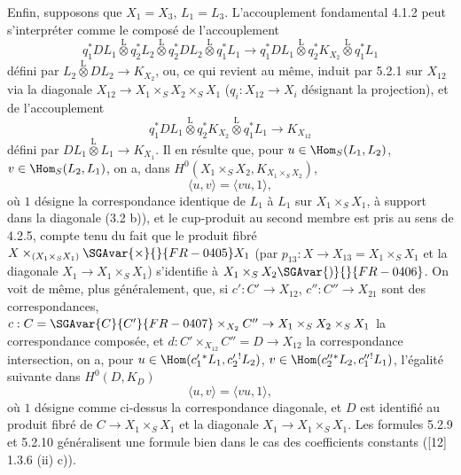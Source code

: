Enfin, supposons que $X_1=X_3$, $L_1=L_3$. L'accouplement fondamental 4.1.2 peut s'interpréter comme le composé de l'accouplement
\begin{equation}
\tag{5.2.7}
q_1^*DL_1\overset{\mathrm{L}}{\otimes}q_2^*L_2\overset{\mathrm{L}}{\otimes}q_2^*DL_2\overset{\mathrm{L}}{\otimes}q_1^*L_1
\longrightarrow
q_1^*DL_1\overset{\mathrm{L}}{\otimes}q_2^*K_{X_2}\overset{\mathrm{L}}{\otimes}q_1^*L_1
\end{equation}
défini par $L_2\overset{\mathrm{L}}{\otimes}DL_2\to K_{X_2}$, ou, ce qui revient au même, induit par 5.2.1 sur $X_{12}$ via la diagonale $X_{12}\to X_1\times_SX_2\times_SX_1$ ($q_i:X_{12}\to X_i$ désignant la projection), et de l'accouplement
\begin{equation}
\tag{5.2.8}
q_1^*DL_1\overset{\mathrm{L}}{\otimes}q_2^*K_{X_2}\overset{\mathrm{L}}{\otimes}q_1^*L_1\longrightarrow K_{X_{12}}
\end{equation}
défini par $DL_1\overset{\mathrm{L}}{\otimes}L_1\to K_{X_1}$. Il en résulte que, pour $u\in\Hom_S(L_1,L_2)$, $v\in\Hom_S(L_2,L_1)$, on a, dans $H^0(X_1\times_SX_2,K_{X_1\times_SX_2})$,
\begin{equation}
\tag{5.2.9}
\langle u,v\rangle=\langle vu,1\rangle,
\end{equation}
où $1$ désigne la correspondance identique de $L_1$ à $L_1$ sur $X_1\times_SX_1$, à support dans la diagonale (3.2 b)), et le cup-produit au second membre est pris au sens de 4.2.5, compte tenu du fait que le produit fibré $X\times_{(X_1\times_SX_1)}\SGAvar{\times }{}{FR-0405}X_1$ (par $p_{13}:X\to X_{13}=X_1\times_SX_1$ et la diagonale $X_1\to X_1\times_SX_1$) s'identifie à $X_1\times_SX_2\SGAvar{)}{}{FR-0406}$. On voit de même, plus généralement, que, si $c':C'\to X_{12}$, $c'':C''\to X_{21}$
sont des correspondances, $c:C=\SGAvar{C}{C'}{FR-0407}\times_{X_2}C''\to X_1\times_SX_2\times_SX_1$ la 
correspondance composée, et $d:C'\times_{X_{12}}C''=D\to X_{12}$ la correspondance intersection, on a, pour $u\in\Hom(c_1'{}^*L_1,c_2'{}^!L_2)$, $v\in\Hom(c_2''{}^*L_2,c_1''{}^!L_1)$, l'égalité suivante dans $H^0(D,K_D)$
\begin{equation}
\tag{5.2.10}
\langle u,v\rangle=\langle vu,1\rangle,
\end{equation}
où $1$ désigne comme ci-dessus la correspondance diagonale, et $D$ est identifié au produit fibré de $C\to X_1\times_SX_1$ et la diagonale $X_1\to X_1\times_SX_1$. Les formules 5.2.9 et 5.2.10 généralisent une formule bien  dans le cas des coefficients constants ([12] 1.3.6 (ii) c)).

